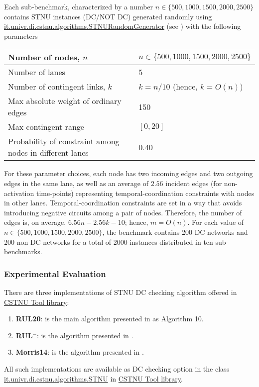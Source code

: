 \documentclass[a4paper,11pt]{article}
\begin{document}
Each sub-benchmark, characterized by a number $n\in\{500,1000,1500,2000,2500\}$ contains STNU instances (DC\slash NOT DC) generated randomly using \href{http://profs.scienze.univr.it/~posenato/software/cstnu/apidocs/it/univr/di/cstnu/algorithms/STNURandomGenerator.html}{it.univr.di.cstnu.algorithms.STNURandomGenerator}
(see ) with the following parameters
\begin{center}\begin{tabular}{|p{2.5in}|p{5.5cm}|} \hline
Number of nodes, $n$ & $n \in \{500, 1000, 1500, 2000, 2500\}$ \\ \hline
Number of lanes & 5\\ \hline
Number of contingent links, $k$ & $k = n / 10$ (hence, $k = O(n)$) \\ \hline
Max absolute weight of ordinary edges & 150 \\ \hline
Max contingent range & $[0,20]$ \\ \hline
Probability of constraint among nodes in different lanes & 0.40 \\ \hline
\end{tabular}\end{center}
For these parameter choices, each node has two incoming edges and two outgoing edges in the same lane, as well as an average of $2.56$ incident edges (for non-activation time-points) representing temporal-coordination constraints with 
nodes in other lanes.
Temporal-coordination constraints are set in a way that avoids introducing negative circuits among a pair of nodes.  
Therefore, the number of edges is, on average,  $6.56 n - 2.56 k - 10$; hence, $m = O(n)$.
For each value of $n \in \{500, 1000, 1500, 2000, 2500\}$, the benchmark contains 200 DC networks and 200 non-DC networks for a total of 2000 instances distributed in ten sub-benchmarks.


\newcommand{\rulTwenty}{RUL20}
\newcommand{\RULminus}{RUL$^-$}
\newcommand{\rulEighteen}{\RULminus}
\newcommand{\morrisFourteen}{Morris14}
\subsubsection{Experimental Evaluation}

There are three implementations of STNU DC checking algorithm offered in 
\href{http://profs.scienze.univr.it/~posenato/software/cstnu/}{CSTNU Tool library}:
\begin{enumerate}
	\item \textbf{\rulTwenty}: is the main algorithm presented in \cite{HunsbergerPTR21} as Algorithm 10.
	
	\item \textbf{\RULminus}: is the algorithm presented in \cite{CairoHR18}. 
	
	\item \textbf{\morrisFourteen}: is the algorithm presented in \cite{Morris14}.
\end{enumerate}
All such implementations are available as DC checking option in the class 
\href{http://profs.scienze.univr.it/~posenato/software/cstnu/apidocs/it/univr/di/cstnu/algorithms/STNU.html}{it.univr.di.cstnu.algorithms.STNU} in \href{http://profs.scienze.univr.it/~posenato/software/cstnu/}{CSTNU Tool library}.
\end{document}
